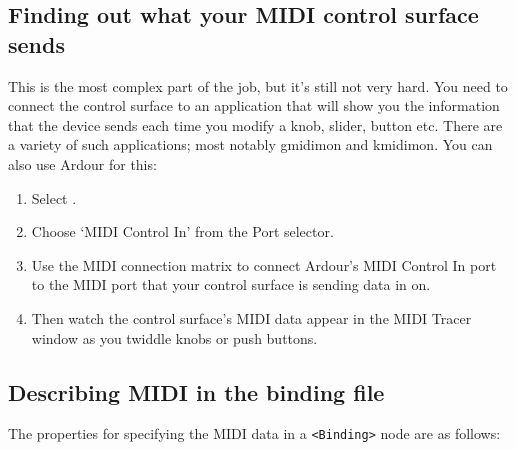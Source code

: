 \documentclass[10pt,a4paper]{book}
\newcommand{\menu}[1]{\emph{\StrSubstitute{#1}{,}{ $\rightarrow$ }}}
\begin{document}


\subsection{Finding out what your MIDI control surface sends}

This is the most complex part of the job, but it's still not very hard.
You need to connect the control surface to an application that will
show you the information that the device sends each time you modify a
knob, slider, button etc.  There are a variety of such applications;
most notably gmidimon and kmidimon.  You can also use Ardour for this:

\begin{enumerate}
\item Select \menu{Window,MIDI Tracer}.
\item Choose `MIDI Control In' from the Port selector.
\item Use the MIDI connection matrix to connect Ardour's
MIDI Control In port to the MIDI port that your control surface is
sending data in on.
\item Then watch the control surface's MIDI data appear
in the MIDI Tracer window as you twiddle knobs or push buttons.
\end{enumerate}


\subsection{Describing MIDI in the binding file}

The properties for specifying the MIDI data in a \texttt{<Binding>}
node are as follows:
\end{document}
